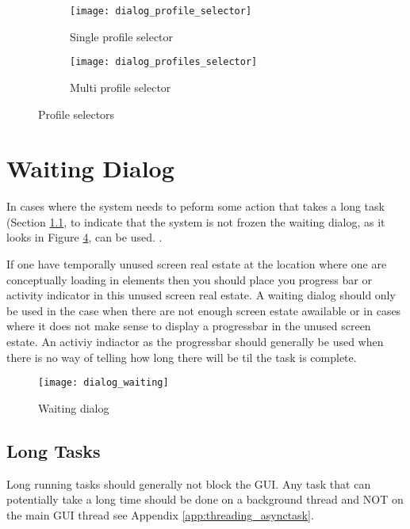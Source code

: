 \begin{figure}[!htbp]
    \centering
    \begin{subfigure}[t]{0.4\textwidth}
    	\centering
        \texttt{[image: dialog\_profile\_selector]}
        \caption{Single profile selector}
        \label{fig:profile_selector_dialog}
    \end{subfigure}
    \hspace{5em}
    \begin{subfigure}[t]{0.4\textwidth}
    	\centering
        \texttt{[image: dialog\_profiles\_selector]}
        \caption{Multi profile selector}
        \label{fig:profiles_selector_dialog}
    \end{subfigure}
    
    \caption{Profile selectors}
    \label{fig:profile_selection}
\end{figure}

\section{Waiting Dialog}
\label{sec:waiting_dialog}

In cases where the system needs to peform some action that takes a long task (Section \ref{sub:long_tasks}, to indicate that the system is not frozen the waiting dialog, as it looks in Figure \ref{fig:dialog_waiting}, can be used. .

\begin{note}
	If one have temporally unused screen real estate at the location where one are conceptually loading in elements then you should place you progress bar or activity indicator in this unused screen real estate. A waiting dialog should only be used in the case when there are not enough screen estate awailable or in cases where it does not make sense to display a progressbar in the unused screen estate. An activiy indiactor as the progressbar should generally be used when there is no way of telling how long there will be til the task is complete. 
\end{note}


\begin{figure}[h]
	\centering
	\texttt{[image: dialog\_waiting]}
	\caption{Waiting dialog}
	\label{fig:dialog_waiting}
\end{figure}
\FloatBarrier

\subsection{Long Tasks}
\label{sub:long_tasks}
Long running tasks should generally not block the GUI. Any task that can potentially take a long time should be done on a background thread and NOT on the main GUI thread see Appendix \ref{app:threading_asynctask}. 

